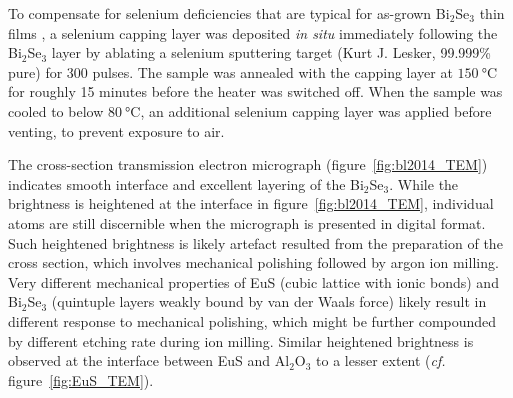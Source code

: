 To compensate for selenium deficiencies that are typical for as-grown Bi$_2$Se$_3$ thin films \cite{Zhanybek3, zhangli2012, zhangli2013, TI_ARPES1, ARPES_thickness}, a selenium capping layer was deposited \textit{in situ} immediately following the Bi$_2$Se$_3$ layer by ablating a selenium sputtering target (Kurt J. Lesker, 99.999\% pure) for 300 pulses. The sample was annealed with the capping layer at $\SI{150}{\degreeCelsius}$ for roughly 15 minutes before the heater was switched off. When the sample was cooled to below $\SI{80}{\degreeCelsius}$, an additional selenium capping layer was applied before venting, to prevent exposure to air.

The cross-section transmission electron micrograph (figure~\ref{fig:bl2014_TEM}) indicates smooth interface and excellent layering of the Bi$_2$Se$_3$. While the brightness is heightened at the interface in figure~\ref{fig:bl2014_TEM}, individual atoms are still discernible when the micrograph is presented in digital format. Such heightened brightness is likely artefact resulted from the preparation of the cross section, which involves mechanical polishing followed by argon ion milling. Very different mechanical properties of EuS (cubic lattice with ionic bonds) and Bi$_2$Se$_3$ (quintuple layers weakly bound by van der Waals force) likely result in different response to mechanical polishing, which might be further compounded by different etching rate during ion milling. Similar heightened brightness is observed at the interface between EuS and Al$_2$O$_3$ to a lesser extent (\textit{cf.} figure~\ref{fig:EuS_TEM}).

